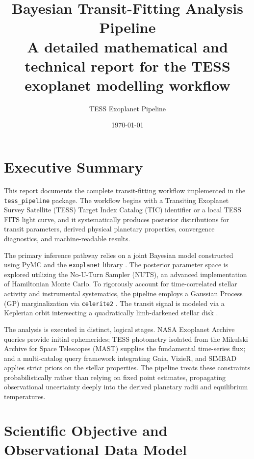 \documentclass[12pt,a4paper,oneside]{report}
\title{\textbf{Bayesian Transit-Fitting Analysis Pipeline}\\[0.5em]
\large A detailed mathematical and technical report for the TESS exoplanet modelling workflow}
\author{TESS Exoplanet Pipeline}
\date{\today}
\newcommand{\code}[1]{\texttt{\small #1}}
\begin{document}
\maketitle
{}
\tableofcontents
\clearpage
{}

\chapter*{Executive Summary}

This report documents the complete transit-fitting workflow implemented in the \code{tess\_pipeline} package. The workflow begins with a Transiting Exoplanet Survey Satellite (TESS) Target Index Catalog (TIC) identifier or a local TESS FITS light curve, and it systematically produces posterior distributions for transit parameters, derived physical planetary properties, convergence diagnostics, and machine-readable results.

The primary inference pathway relies on a joint Bayesian model constructed using PyMC and the \code{exoplanet} library \cite{salvatier2016}. The posterior parameter space is explored utilizing the No-U-Turn Sampler (NUTS), an advanced implementation of Hamiltonian Monte Carlo. To rigorously account for time-correlated stellar activity and instrumental systematics, the pipeline employs a Gaussian Process (GP) marginalization via \code{celerite2} \cite{foremanmackey2017}. The transit signal is modeled via a Keplerian orbit intersecting a quadratically limb-darkened stellar disk \cite{mandel2002}.

The analysis is executed in distinct, logical stages. NASA Exoplanet Archive queries provide initial ephemerides; TESS photometry isolated from the Mikulski Archive for Space Telescopes (MAST) supplies the fundamental time-series flux; and a multi-catalog query framework integrating Gaia, VizieR, and SIMBAD applies strict priors on the stellar properties. The pipeline treats these constraints probabilistically rather than relying on fixed point estimates, propagating observational uncertainty deeply into the derived planetary radii and equilibrium temperatures.

\chapter{Scientific Objective and Observational Data Model}
\end{document}
